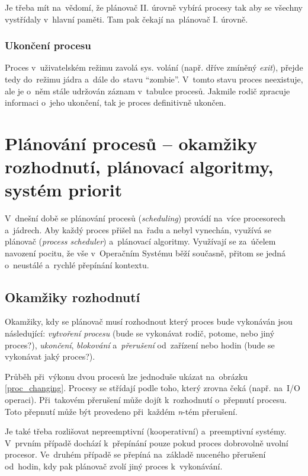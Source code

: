 Je třeba mít na~vědomí, že plánovač II. úrovně vybírá procesy tak aby se všechny vystřídaly v~hlavní paměti. Tam pak čekají na~plánovač I. úrovně. 

\subsubsection{Ukončení procesu}

Proces v~uživatelském režimu zavolá sys. volání (např. dříve zmíněný \emph{exit}), přejde tedy do~režimu jádra a~dále do~stavu \enquote{zombie}. V~tomto stavu proces neexistuje, ale je o~něm stále udržován záznam v~tabulce procesů. Jakmile rodič zpracuje informaci o~jeho ukončení, tak je proces definitivně ukončen.


\clearpage
\section{Plánování procesů -- okamžiky rozhodnutí, plánovací algoritmy, systém priorit}
\label{planning}

V~dnešní době se plánování procesů (\emph{scheduling}) provádí na~více procesorech a~jádrech. Aby každý proces přišel na~řadu a nebyl vynechán, využívá se plánovač (\emph{process scheduler}) a~plánovací algoritmy. Využívají se za~účelem navození pocitu, že vše v~Operačním Systému běží současně, přitom se jedná o~neustálé a~rychlé přepínání kontextu.

\subsection{Okamžiky rozhodnutí}

Okamžiky, kdy se plánovač musí rozhodnout který proces bude vykonáván jsou následující: \emph{vytvoření procesu} (bude se vykonávat rodič, potome, nebo jiný proces?), \emph{ukončení}, \emph{blokování} a~\emph{přerušení} od~zařízení nebo hodin (bude se vykonávat jaký proces?).

Průběh při~výkonu dvou procesů lze jednoduše ukázat na~obrázku \ref{proc_changing}. Procesy se střídají podle toho, který zrovna čeká (např. na~I/O operaci). Při~takovém přerušení může dojít k~rozhodnutí o~přepnutí procesu. Toto přepnutí může být provedeno při~každém \emph{n}-tém přerušení.

Je také třeba rozlišovat nepreemptivní (kooperativní) a~preemptivní systémy. V~prvním případě dochází k~přepínání pouze pokud proces dobrovolně uvolní procesor. Ve~druhém případě se přepíná na~základě nuceného přerušení od~hodin, kdy pak plánovač zvolí jiný proces k~vykonávání. 


